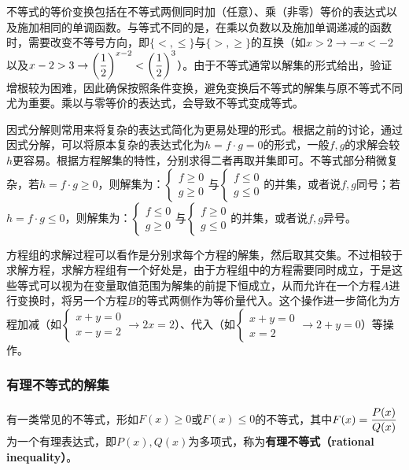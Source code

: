 不等式的等价变换包括在不等式两侧同时加（任意）、乘（非零）等价的表达式以及施加相同的单调函数。与等式不同的是，在乘以负数以及施加单调递减的函数时，需要改变不等号方向，即$\{<,\leq\}$与$\{>,\geq\}$的互换（如$x>2\to-x<-2$以及$\displaystyle x-2>3\to\left({1\over2}\right)^{x-2}<\left({1\over2}\right)^3$）。由于不等式通常以解集的形式给出，验证增根较为困难，因此确保按照条件变换，避免变换后不等式的解集与原不等式不同尤为重要。乘以与零等价的表达式，会导致不等式变成等式。

因式分解则常用来将复杂的表达式简化为更易处理的形式。根据之前的讨论，通过因式分解，可以将原本复杂的表达式化为$h=f\cdot g=0$的形式，一般$f,g$的求解会较$h$更容易。根据方程解集的特性，分别求得二者再取并集即可。不等式部分稍微复杂，若$h=f\cdot g\geq0$，则解集为：$\begin{cases}f \geq 0 \\ g \geq 0\end{cases}$与$\begin{cases}f \leq 0 \\ g \leq 0\end{cases}$的并集，或者说$f,g$同号；若$h=f\cdot g\leq0$，则解集为：$\begin{cases}f \leq 0 \\ g \geq 0\end{cases}$与$\begin{cases}f \geq 0 \\ g \leq 0\end{cases}$的并集，或者说$f,g$异号。

方程组的求解过程可以看作是分别求每个方程的解集，然后取其交集。不过相较于求解方程，求解方程组有一个好处是，由于方程组中的方程需要同时成立，于是这些等式可以视为在变量取值范围为解集的前提下恒成立，从而允许在一个方程$A$进行变换时，将另一个方程$B$的等式两侧作为等价量代入。这个操作进一步简化为方程加减（如$\begin{cases}x+y= 0 \\ x-y =2\end{cases}\to 2x=2$）、代入（如$\begin{cases}x+y= 0 \\ x=2\end{cases}\to 2+y=0$）等操作。

\subsubsection{有理不等式的解集}

有一类常见的不等式，形如$F(x) \geq 0$或$F(x) \leq 0$的不等式，其中$\displaystyle F(x)={P(x)\over Q(x)}$为一个有理表达式，即$P(x),Q(x)$为多项式，称为\textbf{有理不等式（rational inequality）}。

